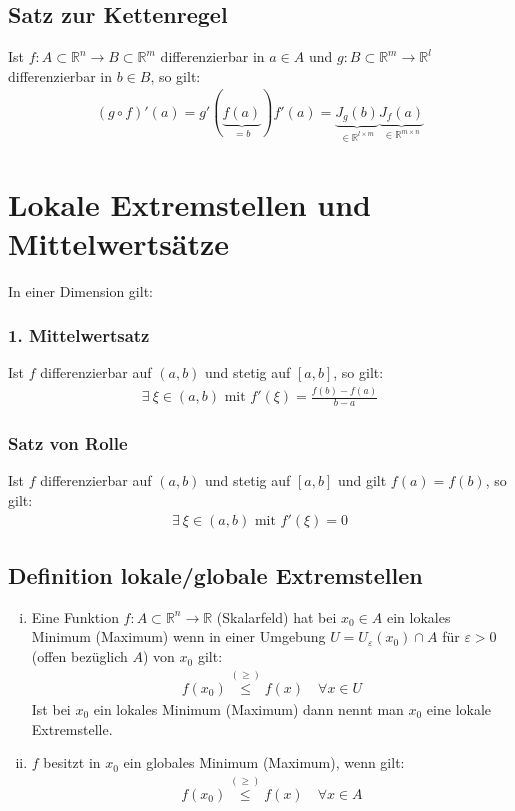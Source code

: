 \documentclass[11pt,a4paper]{book}
\newcommand {\R}	{\mathbb{R}}
\newcommand {\Rn}	{\mathbb{R}^n}
\newcommand {\Rm}	{\mathbb{R}^m}
\newcommand{\1}    	{\mathbbm{1}}
\newcommand{\mitt}	{\textrm{ mit }}
\begin{document}
\subsection{Satz zur Kettenregel}
Ist \(f: A \subset \Rn \rightarrow B \subset \Rm\) differenzierbar in \(a \in A\) und \(g: B \subset \Rm \rightarrow \R^l\) differenzierbar in \(b \in B\), so gilt:
\begin{align*}
	(g \circ f)'(a) = g'\left(\underbrace{f(a)}_{=b}\right) f'(a) = 
	\underbrace{ J_g (b) }_{\in \R^{l \times m}}
	\underbrace{ J_f (a) }_{\in \R^{m \times n}}
\end{align*}

\section{Lokale Extremstellen und Mittelwertsätze}

In einer Dimension gilt:
\subsubsection*{1. Mittelwertsatz}
Ist \(f\) differenzierbar auf \((a,b)\) und stetig auf \([a,b]\), so gilt:
\begin{align*}
	\exists~ \xi \in (a,b) \mitt f'(\xi) = \frac{f(b) - f(a)}{b - a}
\end{align*}

\subsubsection*{Satz von Rolle}
Ist \(f\) differenzierbar auf \((a,b)\) und stetig auf \([a,b]\) und gilt \(f(a) = f(b)\), so gilt:
\begin{align*}
	\exists~ \xi \in (a,b) \mitt f'(\xi) = 0
\end{align*}

\subsection{Definition lokale/globale Extremstellen}
\begin{enumerate}[(i)]
	\item Eine Funktion \(f: A \subset \Rn \rightarrow \R \) (Skalarfeld) hat bei \(x_0 \in A\) ein lokales Minimum (Maximum) wenn in einer Umgebung \(U = U_\varepsilon (x_0) \cap A\) für \( \varepsilon > 0\) (offen bezüglich \(A\)) von \(x_0\) gilt:
	\begin{align*}
		f(x_0) \stackrel{(\geqslant)}{\leqslant} f(x) \quad \forall x \in U
	\end{align*}	 
	Ist bei \(x_0\) ein lokales Minimum (Maximum) dann nennt man \(x_0\) eine lokale Extremstelle. 
	\item \(f\) besitzt in \(x_0\) ein globales Minimum (Maximum), wenn gilt:
	\begin{align*}
		f(x_0) \stackrel{(\geqslant)}{\leqslant} f(x) \quad \forall x \in A
	\end{align*}
\end{enumerate}
\end{document}
